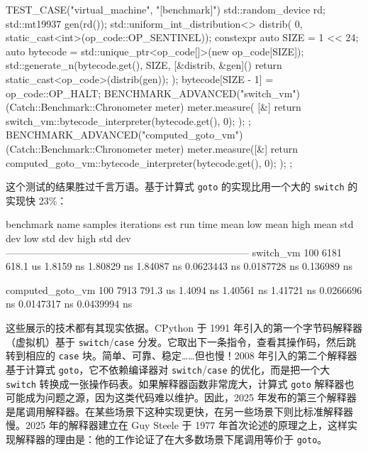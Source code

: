 \begin{codebox}[cpp]
TEST_CASE("virtual_machine", "[benchmark]") {
  std::random_device rd;
  std::mt19937 gen(rd());
  std::uniform_int_distribution<> distrib(
      0, static_cast<int>(op_code::OP_SENTINEL));
  constexpr auto SIZE = 1 << 24;
  auto bytecode = std::unique_ptr<op_code[]>(new op_code[SIZE]);
  std::generate_n(bytecode.get(), SIZE, [&distrib, &gen]() {
    return static_cast<op_code>(distrib(gen));
  });
  bytecode[SIZE - 1] = op_code::OP_HALT;
  BENCHMARK_ADVANCED("switch_vm")(Catch::Benchmark::Chronometer meter) {
    meter.measure(
        [&] { return switch_vm::bytecode_interpreter(bytecode.get(), 0); });
  };
  BENCHMARK_ADVANCED("computed_goto_vm")(Catch::Benchmark::Chronometer meter) {
    meter.measure([&] {
      return computed_goto_vm::bytecode_interpreter(bytecode.get(), 0);
    });
  };
}
\end{codebox}

这个测试的结果胜过千言万语。基于计算式 \texttt{goto} 的实现比用一个大的 \texttt{switch} 的实现快 23\%：

\begin{codebox}[text]
benchmark name                  samples       iterations    est run time    
                                mean          low mean      high mean
                                std dev       low std dev   high std dev
--------------------------------------------------------------------------
switch_vm                       100           6181          618.1 us
                                1.8159 ns     1.80829 ns    1.84087 ns
                                0.0623443 ns  0.0187728 ns  0.136989 ns
                                                                           
computed_goto_vm                100           7913          791.3 us
                                1.4094 ns     1.40561 ns    1.41721 ns
                                0.0266696 ns  0.0147317 ns  0.0439994 ns
\end{codebox}

\label{idx:1302}
这些展示的技术都有其现实依据。CPython 于 1991 年引入的第一个字节码解释器（虚拟机）基于 \texttt{switch}/\texttt{case} 分发。它取出下一条指令，查看其操作码，然后跳转到相应的 \texttt{case} 块。简单、可靠、稳定……但也慢！2008 年引入的第二个解释器基于计算式 \texttt{goto}，它不依赖编译器对 \texttt{switch}/\texttt{case} 的优化，而是把一个大 \texttt{switch} 转换成一张操作码表。如果解释器函数非常庞大，计算式 \texttt{goto} 解释器也可能成为问题之源，因为这类代码难以维护。因此，2025 年发布的第三个解释器是尾调用解释器。在某些场景下这种实现更快，在另一些场景下则比标准解释器慢。2025 年的解释器建立在 Guy Steele 于 1977 年首次论述的原理之上，这样实现解释器的理由是：他的工作论证了在大多数场景下尾调用等价于 \texttt{goto}。

